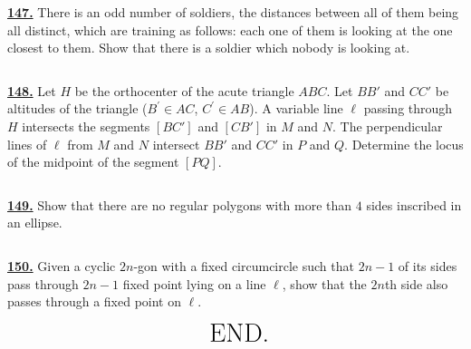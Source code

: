 \documentclass{article}
\begin{document}
$$ $$


\href{ http://www.artofproblemsolving.com/Forum/viewtopic.php?p=773#p773}{\bf 147.}  There is an odd number of soldiers, the distances between all of them being all distinct, which are  training as follows: each one of them is looking at the one closest to them. Show that there is a soldier which nobody is looking at.

$$ $$


\href{http://www.artofproblemsolving.com/Forum/viewtopic.php?p=181685#p181685 }{\bf 148.} Let $H$ be the orthocenter of the acute triangle $ABC$. Let $BB'$ and $CC'$ be altitudes of the triangle ($B^{\prime} \in AC$, $C^{\prime} \in AB$). A variable line $\ell$ passing through $H$ intersects the segments $[BC']$ and $[CB']$ in $M$ and $N$. The perpendicular lines of $\ell$ from $M$ and $N$ intersect $BB'$ and $CC'$ in $P$ and $Q$. Determine the locus of the midpoint of the segment $[ PQ]$.

$$ $$


\href{http://www.artofproblemsolving.com/Forum/viewtopic.php?p=117715#p117715 }{\bf 149.} Show that there are no regular polygons with more than $4$ sides inscribed in an ellipse.

$$ $$


\href{http://www.artofproblemsolving.com/Forum/viewtopic.php?p=117345#p117345 }{\bf 150.} Given a cyclic $2n$-gon with a fixed circumcircle such that $2n-1$ of its sides pass through $2n-1$ fixed point lying on a line $\ell$, show that the $2n$th side also passes through a fixed point on $\ell$.


$$ \huge \text{ END.}$$
\end{document}
